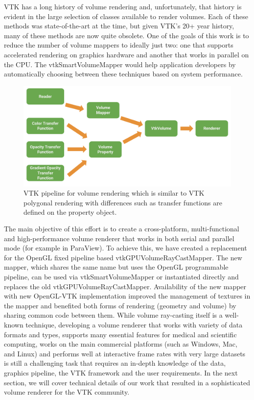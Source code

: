VTK has a long history of volume rendering and, unfortunately, that history is
evident in the large selection of classes available to render volumes. Each of
these methods was state-of-the-art at the time, but given VTK’s 20+ year
history, many of these methods are now quite obsolete. One of the goals of this
work is to reduce the number of volume mappers to ideally just two: one that
supports accelerated rendering on graphics hardware and another that works in
parallel on the CPU. The vtkSmartVolumeMapper would help application developers
by automatically choosing between these techniques based on system performance. 

\begin{figure}[h]
  \centering
  \includegraphics[width=\columnwidth]{vtk_volume_pipeline.pdf}
  \caption{VTK pipeline for volume rendering which is similar to VTK polygonal
    rendering with differences such as transfer functions are defined on the
    property object.}
  \label{fig:pipeline}
\end{figure}%

The main objective of this effort is to create a cross-platform,
multi-functional and high-performance volume renderer that works in both serial
and parallel mode (for example in
ParaView\cite{ahrens_paraview:_2005,ayachit_paraview_2015}). To achieve this,
we have created a replacement for the OpenGL fixed pipeline based
vtkGPUVolumeRayCastMapper. The new mapper, which shares the same name but uses
the OpenGL programmable pipeline, can be used via vtkSmartVolumeMapper or
instantiated directly and replaces the old vtkGPUVolumeRayCastMapper.
Availability of the new mapper with new OpenGL-VTK implementation improved the
management of textures in the mapper and benefited both forms of rendering
(geometry and volume) by sharing common code between them. While volume
ray-casting itself is a well-known technique, developing a volume renderer that
works with variety of data formats and types, supports many essential features
for medical and scientific computing, works on the main commercial platforms
(such as Windows, Mac, and Linux) and performs well at interactive frame rates
with very large datasets is still a challenging task that requires an in-depth
knowledge of the data, graphics pipeline, the VTK framework and the user
requirements.  In the next section, we will cover technical details of our work
that resulted in a sophisticated volume renderer for the VTK community.
